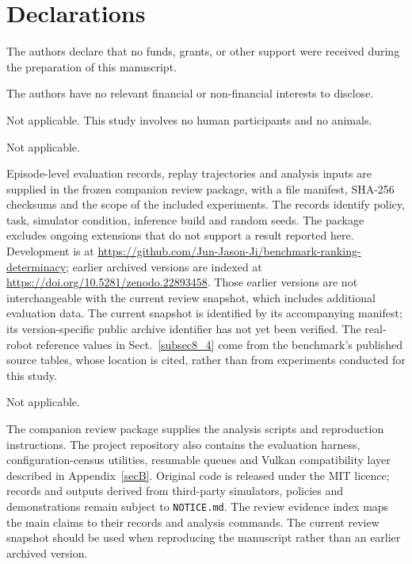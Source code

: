 \documentclass[pdflatex,iicol,sn-apa]{sn-jnl}
\theoremstyle{remark}
\begin{document}
\section*{Declarations}

The authors declare that no funds, grants, or other support were received during the preparation of
this manuscript.

The authors have no relevant financial or non-financial interests to disclose.

Not applicable. This study involves no human participants and no animals.

Not applicable.

Episode-level evaluation records, replay trajectories and analysis inputs are supplied in the frozen
companion review package, with a file manifest, SHA-256 checksums and the scope of the included
experiments. The records identify policy, task, simulator condition, inference build and random
seeds. The package excludes ongoing extensions that do not support a result reported here.
Development is at \url{https://github.com/Jun-Jason-Ji/benchmark-ranking-determinacy}; earlier
archived versions are indexed at \url{https://doi.org/10.5281/zenodo.22893458}. Those earlier
versions are not interchangeable with the current review snapshot, which includes additional
evaluation data. The current snapshot is identified by its accompanying manifest; its
version-specific public archive identifier has not yet been verified. The real-robot reference
values in Sect.~\ref{subsec8_4} come from the benchmark's published source tables, whose location
is cited, rather than from experiments conducted for this study.

Not applicable.

The companion review package supplies the analysis scripts and reproduction instructions. The
project repository also contains the evaluation harness, configuration-census utilities, resumable
queues and Vulkan compatibility layer described in Appendix~\ref{secB}. Original code is released
under the MIT licence; records and outputs derived from third-party simulators, policies and
demonstrations remain subject to \texttt{NOTICE.md}. The review evidence index maps the main claims
to their records and analysis commands. The current review snapshot should be used when reproducing
the manuscript rather than an earlier archived version.
\end{document}
